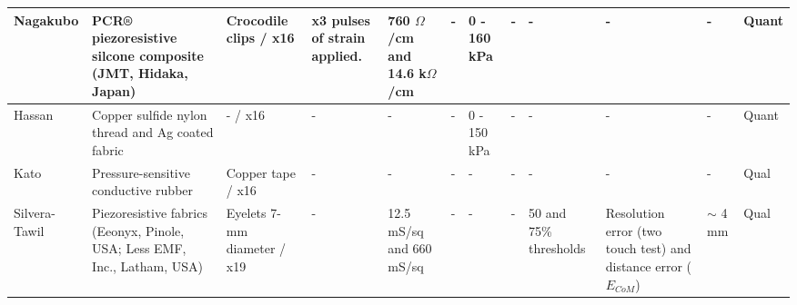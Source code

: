 \begin{landscape}
\begin{table}[H]
\begin{tabular}{|L{1.9cm}|L{2.8cm}|L{2.0cm}|L{2.4cm}|L{2.2cm}|L{2.0cm}|L{1.7cm}|L{1.7cm}|L{2.5cm}|L{2.2cm}|L{1.6cm}|L{1.6cm}|}
			Nagakubo \citep{Nagakubo2007} & PCR® piezoresistive silcone composite (JMT, Hidaka, Japan) & Crocodile clips / x16 & x3 pulses of strain applied. & 760 $\Omega$/cm and 14.6 k$\Omega$/cm & - & 0 - 160 kPa & - & - & - & - & Quant \\ \hline
			
			Hassan \citep{Hassan2009} & Copper sulfide nylon thread and Ag coated fabric & - / x16 & - & - & - & 0 - 150 kPa & - & - & - & - & Quant \\ \hline
			
			Kato \citep{Kato2007b} & Pressure-sensitive conductive rubber & Copper tape / x16 & - & - & - & - & - & - & - & - & Qual \\ \hline
			
			Silvera-Tawil \citep{Tawil2011} & Piezoresistive fabrics (Eeonyx, Pinole, USA; Less EMF, Inc., Latham, USA) & Eyelets 7-mm diameter / x19 & - & 12.5 mS/sq and 660 mS/sq & - & - & - & 50 and 75\% thresholds & Resolution error (two touch test) and distance error ($E_{CoM}$) & $\sim$ 4 mm & Qual \\ \hline
			
		\end{tabular}
	\end{table}
\end{landscape}

